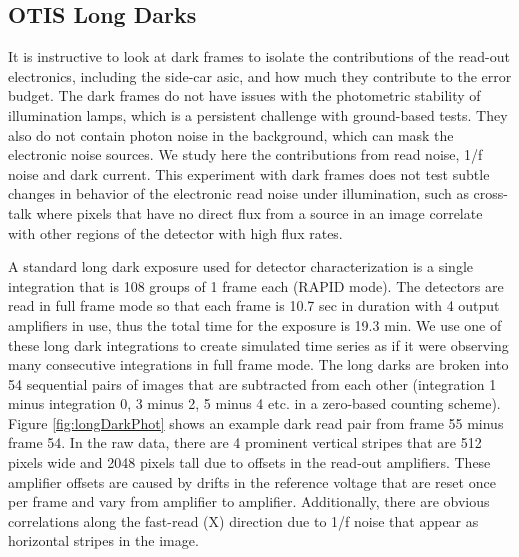 \documentclass{aastex62}
\begin{document}
\clearpage
\subsection{OTIS Long Darks}\label{sec:longDarks}

It is instructive to look at dark frames to isolate the contributions of the read-out electronics, including the side-car asic, and how much they contribute to the error budget.
The dark frames do not have issues with the photometric stability of illumination lamps, which is a persistent challenge with ground-based tests.
They also do not contain photon noise in the background, which can mask the electronic noise sources.
We study here the contributions from read noise, 1/f noise and dark current.
This experiment with dark frames does not test subtle changes in behavior of the electronic read noise under illumination, such as cross-talk where pixels that have no direct flux from a source in an image correlate with other regions of the detector with high flux rates.

A standard long dark exposure used for detector characterization is a single integration that is 108 groups of 1 frame each (RAPID mode).
The detectors are read in full frame mode so that each frame is 10.7 sec in duration with 4 output amplifiers in use, thus the total time for the exposure is 19.3 min.
We use one of these long dark integrations to create simulated time series as if it were observing many consecutive integrations in full frame mode.
The long darks are broken into 54 sequential pairs of images that are subtracted from each other (integration 1 minus integration 0, 3 minus 2, 5 minus 4 etc. in a zero-based counting scheme).
Figure \ref{fig:longDarkPhot} shows an example dark read pair from frame 55 minus frame 54.
In the raw data, there are 4 prominent vertical stripes that are 512 pixels wide and 2048 pixels tall due to offsets in the read-out amplifiers.
These amplifier offsets are caused by drifts in the reference voltage that are reset once per frame and vary from amplifier to amplifier.
Additionally, there are obvious correlations along the fast-read (X) direction due to 1/f noise that appear as horizontal stripes in the image.
\end{document}
